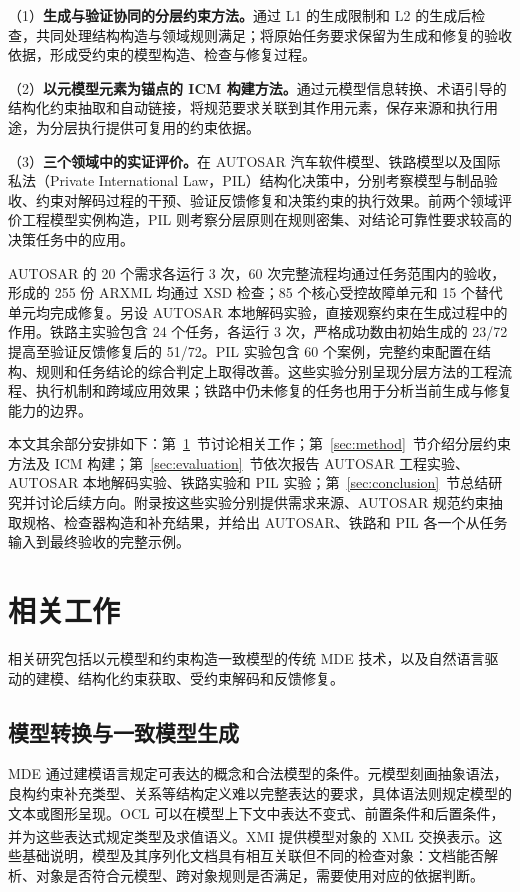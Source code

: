 \documentclass[pdflatex,iicol,sn-mathphys-num]{sn-jnl}
\newcommand{\paperref}[1]{\textsuperscript{\textcolor{citationred}{\citep{#1}}}}
\begin{document}
（1）\textbf{生成与验证协同的分层约束方法。}通过 L1 的生成限制和 L2 的生成后检查，共同处理结构构造与领域规则满足；将原始任务要求保留为生成和修复的验收依据，形成受约束的模型构造、检查与修复过程。


（2）\textbf{以元模型元素为锚点的 ICM 构建方法。}通过元模型信息转换、术语引导的结构化约束抽取和自动链接，将规范要求关联到其作用元素，保存来源和执行用途，为分层执行提供可复用的约束依据。


（3）\textbf{三个领域中的实证评价。}在 AUTOSAR 汽车软件模型、铁路模型以及国际私法（Private International Law，PIL）结构化决策中，分别考察模型与制品验收、约束对解码过程的干预、验证反馈修复和决策约束的执行效果。前两个领域评价工程模型实例构造，PIL 则考察分层原则在规则密集、对结论可靠性要求较高的决策任务中的应用。


AUTOSAR 的 20 个需求各运行 3 次，60 次完整流程均通过任务范围内的验收，形成的 255 份 ARXML 均通过 XSD 检查；85 个核心受控故障单元和 15 个替代单元均完成修复。另设 AUTOSAR 本地解码实验，直接观察约束在生成过程中的作用。铁路主实验包含 24 个任务，各运行 3 次，严格成功数由初始生成的 23/72 提高至验证反馈修复后的 51/72。PIL 实验包含 60 个案例，完整约束配置在结构、规则和任务结论的综合判定上取得改善。这些实验分别呈现分层方法的工程流程、执行机制和跨域应用效果；铁路中仍未修复的任务也用于分析当前生成与修复能力的边界。


本文其余部分安排如下：第~\ref{sec:related}~节讨论相关工作；第~\ref{sec:method}~节介绍分层约束方法及 ICM 构建；第~\ref{sec:evaluation}~节依次报告 AUTOSAR 工程实验、AUTOSAR 本地解码实验、铁路实验和 PIL 实验；第~\ref{sec:conclusion}~节总结研究并讨论后续方向。附录按这些实验分别提供需求来源、AUTOSAR 规范约束抽取规格、检查器构造和补充结果，并给出 AUTOSAR、铁路和 PIL 各一个从任务输入到最终验收的完整示例。


\FloatBarrier

\section{相关工作}\label{sec:related}

相关研究包括以元模型和约束构造一致模型的传统 MDE 技术，以及自然语言驱动的建模、结构化约束获取、受约束解码和反馈修复。


\subsection{模型转换与一致模型生成}\label{sec:related-2-1}

MDE 通过建模语言规定可表达的概念和合法模型的条件。元模型刻画抽象语法，良构约束补充类型、关系等结构定义难以完整表达的要求，具体语法则规定模型的文本或图形呈现。OCL 可以在模型上下文中表达不变式、前置条件和后置条件，并为这些表达式规定类型及求值语义\paperref{OMG2014OCL24}。XMI 提供模型对象的 XML 交换表示\paperref{OMG2015XMI251}。这些基础说明，模型及其序列化文档具有相互关联但不同的检查对象：文档能否解析、对象是否符合元模型、跨对象规则是否满足，需要使用对应的依据判断。
\end{document}
